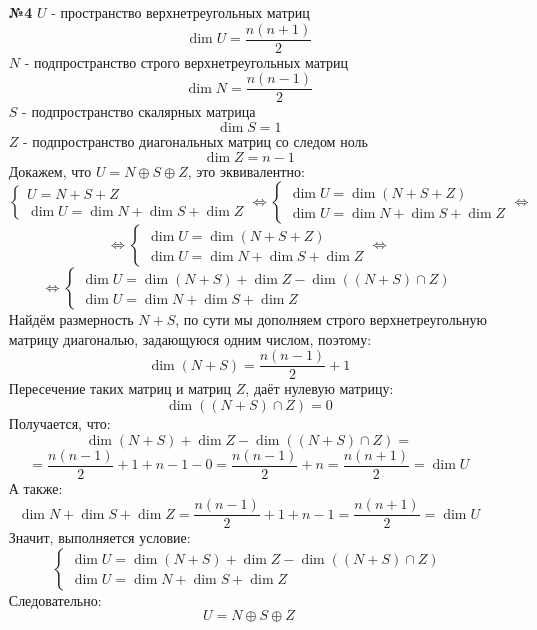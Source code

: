 \documentclass[a4paper]{article}
\renewcommand{\f}[2]{\frac{#1}{#2}}
\newcommand{\case}[1]{\begin{cases} #1 \end{cases}}
\newcommand{\lr}{\Leftrightarrow}
\begin{document}
\begin{enumerate}
    \item[\textbf{№4}] $U$ - пространство верхнетреугольных матриц
    $$\dim U = \f{n(n+1)}{2}$$
    $N$ - подпространство строго верхнетреугольных матриц
    $$\dim N = \f{n(n-1)}{2}$$
    $S$ - подпространство скалярных матрица
    $$\dim S = 1$$
    $Z$ - подпространство диагональных матриц со следом ноль
    $$\dim Z = n-1$$
    Докажем, что $U = N \oplus S \oplus Z$, это эквивалентно:
    $$\case{
        U = N + S + Z\\
        \dim U = \dim N + \dim S + \dim Z
    }\lr \case{
        \dim U = \dim(N + S + Z)\\
        \dim U = \dim N + \dim S + \dim Z
    } \lr$$
    $$\lr \case{
        \dim U = \dim(N + S + Z)\\
        \dim U = \dim N + \dim S + \dim Z
    } \lr$$$$\lr \case{
        \dim U= \dim (N+S) + \dim Z - \dim ((N+S) \cap Z)\\
        \dim U = \dim N + \dim S + \dim Z
    }$$
    Найдём размерность $N + S$, по сути мы дополняем строго верхнетреугольную матрицу диагональю, задающуюся одним числом, поэтому:
    $$\dim (N + S) =  \f{n(n-1)}{2} + 1$$
    Пересечение таких матриц и матриц $Z$, даёт нулевую матрицу:
    $$\dim ((N+S) \cap Z) = 0$$
    Получается, что:
    $$\dim (N+S) + \dim Z - \dim ((N+S) \cap Z) = $$
    $$=\f{n(n-1)}{2} + 1 + n-1 - 0  = \f{n(n-1)}{2} + n = \f{n(n+1)}{2} = \dim U$$
    А также:
    $$\dim N + \dim S + \dim Z = \f{n(n-1)}{2} + 1 + n-1 = \f{n(n+1)}{2}= \dim U$$
    Значит, выполняется условие:
    $$\case{
        \dim U= \dim (N+S) + \dim Z - \dim ((N+S) \cap Z)\\
        \dim U = \dim N + \dim S + \dim Z
    }$$
    Следовательно:
    $$U = N \oplus S \oplus Z$$
    
\end{enumerate}
\end{document}
